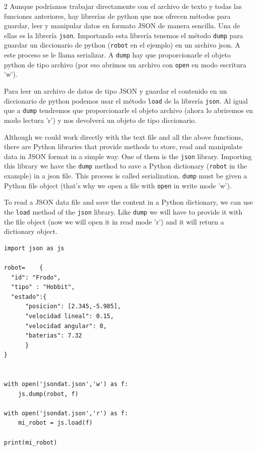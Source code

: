 \begin{paracol}{2}
    Aunque podríamos trabajar directamente con el archivo de texto y todas las funciones anteriores, hay librerías de python que nos ofrecen métodos para guardar, leer y manipular datos en formato JSON de manera sencilla. Una de ellas es la librería \texttt{json}. Importando esta librería tenemos el método \texttt{dump} para guardar un diccionario de python (\texttt{robot} en el ejemplo) en un archivo json. A este proceso se le llama serializar. A \texttt{dump} hay que proporcionarle el objeto python de tipo archivo (por eso abrimos un archivo con \texttt{open} en modo escritura 'w').

    Para leer un archivo de datos de tipo JSON y guardar el contenido en un diccionario de python podemos usar el método \texttt{load} de la librería \texttt{json}. Al igual que a \texttt{dump} tendremos que proporcionarle el objeto archivo (ahora lo abriremos en modo lectura 'r') y nos devolverá un objeto de tipo diccionario.
    
\switchcolumn
    Although we could work directly with the text file and all the above functions, there are Python libraries that provide methods to store, read and manipulate data in JSON format in a simple way. One of them is the \texttt{json} library. Importing this library we have the \texttt{dump} method to save a Python dictionary (\texttt{robot} in the example) in a json file. This process is called serialization. \texttt{dump} must be given a Python file object (that's why we open a file with \texttt{open} in write mode 'w').

    To read a JSON data file and save the content in a Python dictionary, we can use the \texttt{load} method of the \texttt{json} library. Like \texttt{dump} we will have to provide it with the file object (now we will open it in read mode 'r') and it will return a dictionary object.

\switchcolumn


\end{paracol}

\begin{verbatim}
import json as js

robot=    {
  "id": "Frodo",
  "tipo" : "Hobbit",    
  "estado":{
      "posicion": [2.345,-5.985],
      "velocidad lineal": 0.15,
      "velocidad angular": 0,
      "baterias": 7.32
      }
}


with open('jsondat.json','w') as f:
    js.dump(robot, f)

with open('jsondat.json','r') as f:
    mi_robot = js.load(f)

print(mi_robot)
\end{verbatim}

